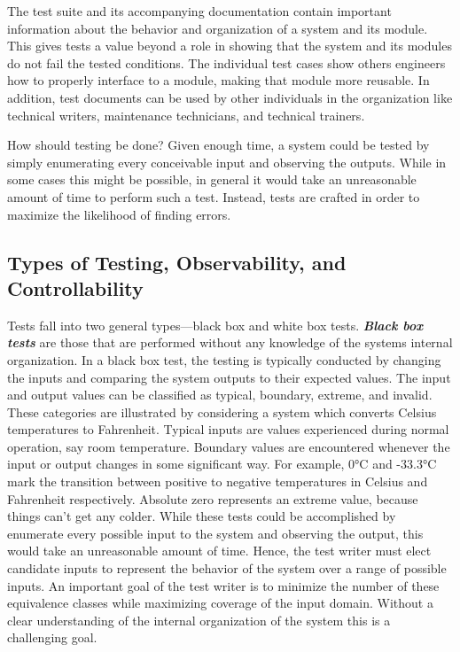 The test suite and its accompanying documentation contain important
information about the behavior and organization of a system and its
module. This gives tests a value beyond a role in showing that the
system and its modules do not fail the tested conditions. The individual
test cases show others engineers how to properly interface to a module,
making that module more reusable. In addition, test documents can be
used by other individuals in the organization like technical writers,
maintenance technicians, and technical trainers.

How should testing be done? Given enough time, a system could be tested
by simply enumerating every conceivable input and observing the outputs.
While in some cases this might be possible, in general it would take an
unreasonable amount of time to perform such a test. Instead, tests are
crafted in order to maximize the likelihood of finding errors.

\subsection{Types of Testing, Observability, and Controllability}
\label{subsection:types-of-testing-observability-and-controllability}

Tests fall into two general types---black box and white box tests.
\emph{\textbf{Black box tests}} are those that are performed without any
knowledge of the systems internal organization. In a black box test, the
testing is typically conducted by changing the inputs and comparing the
system outputs to their expected values. The input and output values can
be classified as typical, boundary, extreme, and invalid. These
categories are illustrated by considering a system which converts
Celsius temperatures to Fahrenheit. Typical inputs are values
experienced during normal operation, say room temperature. Boundary
values are encountered whenever the input or output changes in some
significant way. For example, 0°C and -33.3°C mark the transition
between positive to negative temperatures in Celsius and Fahrenheit
respectively. Absolute zero represents an extreme value, because things
can't get any colder. While these tests could be accomplished by
enumerate every possible input to the system and observing the output,
this would take an unreasonable amount of time. Hence, the test writer
must elect candidate inputs to represent the behavior of the system over
a range of possible inputs. An important goal of the test writer is to
minimize the number of these equivalence classes while maximizing
coverage of the input domain. Without a clear understanding of the
internal organization of the system this is a challenging goal.

